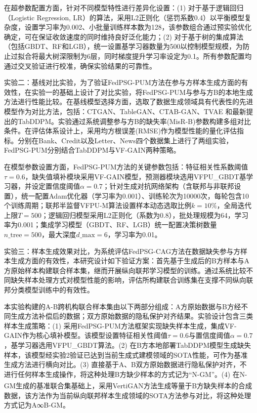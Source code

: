 在超参数配置方面，针对不同模型特性进行差异化设置：(1) 对于基于逻辑回归（Logistic Regression, LR）的算法，采用L2正则化（惩罚系数0.4）以平衡模型复杂度，设置学习率为0.002、小批量训练样本数为128，该参数组合通过预实验优化确定，可在保证收敛速度的同时维持良好泛化能力；(2) 对于基于树的集成算法（包括GBDT、RF和LGB），统一设置基学习器数量为500以控制模型规模，为防止过拟合将最大树深限制为6层，同时梯度提升学习率设定为0.1。所有参数配置均通过交叉验证进行校准，确保实验结果的可靠性。

实验二：基线对比实验，为了验证FedPSG-PUM方法在参与方样本生成方面的有效性，在实验一的基础上设计了对比实验，将FedPSG-PUM与参与方B的本地生成方法进行性能比较。在基线模型选择方面，选取了数据生成领域具有代表性的先进模型作为对比方法，包括：CTGAN、TableGAN、CTAB-GAN、TVAE 和最新提出的TabDDPM。实验通过系统调整参与方B的缺失率(MisR-B)参数构建多组对比条件。在评估体系设计上，采用均方根误差(RMSE)作为模型性能的量化评估指标。分别在Bank、Credit以及Letter、News四个数据集上进行了两组实验，FedPSG-PUM分别结合TabDDPM与VF-GAIN两种策略。

在模型参数设置方面，FedPSG-PUM方法的关键参数包括：特征相关性系数阈值$\tau=0.6$，缺失值填补模块采用VF-GAIN模型，预测器模块选用VFPU\_GBDT基学习器，并设定置信度阈值$\alpha=0.7$；针对生成对抗网络架构（含联邦与非联邦设置），统一配置Adam优化器（学习率为0.001）、训练轮次为10000次，每轮包含10个训练周期；联邦半监督VFPU-M算法设置样本动态选取比例$k=10\%$，全局迭代上限$T=500$；逻辑回归模型采用L2正则化（系数为0.8），批处理规模为64，学习率为0.001；集成学习模型（GBDT、RF、LGB）统一配置决策树数量$n\_{\text{tree}}=500$，最大深度$d\_{\text{max}}=6$，学习率为0.01。

实验三：样本生成效果对比，为系统评估FedPSG-CAG方法在数据缺失参与方样本生成方面的有效性，本研究设计如下验证方案：首先基于生成后的B方样本与A方原始样本构建联合样本集，继而开展纵向联邦学习模型的训练。通过系统比较不同缺失样本处理方式对模型性能的影响，评估所构建联合训练集在支撑不同纵向联邦分类模型训练中的有效性。

本实验构建的A-B跨机构联合样本集由以下两部分组成：A方原始数据与B方经不同生成方法补偿后的数据；双方原始数据的隐私保护对齐结果。实验设计包含三类样本生成策略：(1) 采用FedPSG-PUM方法框架实现缺失样本生成，集成VF-GAIN作为核心填补模型。该模型设置特征相关性阈值$\tau=0.6$与置信度阈值$\alpha=0.7$，基学习器选用VFPU\_GBDT算法。(2) 在B方本地部署TabDDPM模型生成缺失样本，该模型经实验2验证已达到当前生成式建模领域的SOTA性能，可作为基准生成方法进行横向对比。(3) 直接基于A、B双方原始数据进行隐私保护对齐，不进行任何样本生成操作，将这种处理B方缺少样本的方式记为“N-GM”。(4) 在N-GM生成的基准联合集基础上，采用VertiGAN\textsuperscript{\cite{VertiGAN}}方法生成等量于B方缺失样本的合成数据，该方法作为当前纵向联邦样本生成领域的SOTA方法参与对比，将这种处理方式记为A∞B-GM。

